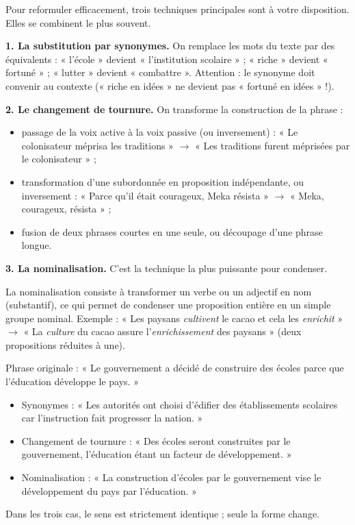\documentclass[11pt]{article}
\newcommand{\cle}[1]{{\popxbold\color{popdark}#1}}
\newcounter{popsec}
\newcounter{popsub}
\newcommand{\courssub}[1]{%
  \stepcounter{popsub}%
  \par\vspace{9pt}\noindent{\popxbold\fontsize{11.5}{13}\selectfont\color{popink}{\color{poporange}\thepopsec.\thepopsub}\hspace{6pt}#1}\par\nopagebreak\vspace{4pt}
}
\begin{document}
\courssub{Les techniques de reformulation}

Pour reformuler efficacement, trois techniques principales sont à votre disposition. Elles se combinent le plus souvent.

\textbf{1. La substitution par synonymes.} On remplace les mots du texte par des équivalents : « l'école » devient « l'institution scolaire » ; « riche » devient « fortuné » ; « lutter » devient « combattre ». Attention : le synonyme doit convenir au contexte (« riche en idées » ne devient pas « fortuné en idées » !).

\textbf{2. Le changement de tournure.} On transforme la construction de la phrase :
\begin{itemize}
\item passage de la voix active à la voix passive (ou inversement) : « Le colonisateur méprisa les traditions » $\rightarrow$ « Les traditions furent méprisées par le colonisateur » ;
\item transformation d'une subordonnée en proposition indépendante, ou inversement : « Parce qu'il était courageux, Meka résista » $\rightarrow$ « Meka, courageux, résista » ;
\item fusion de deux phrases courtes en une seule, ou découpage d'une phrase longue.
\end{itemize}

\textbf{3. La nominalisation.} C'est la technique la plus puissante pour condenser.

\begin{definition}[Nominalisation]
La \cle{nominalisation} consiste à transformer un verbe ou un adjectif en nom (substantif), ce qui permet de condenser une proposition entière en un simple groupe nominal. Exemple : « Les paysans \emph{cultivent} le cacao et cela les \emph{enrichit} » $\rightarrow$ « La \emph{culture} du cacao assure l'\emph{enrichissement} des paysans » (deux propositions réduites à une).
\end{definition}

\begin{exemplebox}
Phrase originale : « Le gouvernement a décidé de construire des écoles parce que l'éducation développe le pays. »
\begin{itemize}
\item Synonymes : « Les autorités ont choisi d'édifier des établissements scolaires car l'instruction fait progresser la nation. »
\item Changement de tournure : « Des écoles seront construites par le gouvernement, l'éducation étant un facteur de développement. »
\item Nominalisation : « La construction d'écoles par le gouvernement vise le développement du pays par l'éducation. »
\end{itemize}
Dans les trois cas, le sens est strictement identique ; seule la forme change.
\end{exemplebox}
\end{document}

